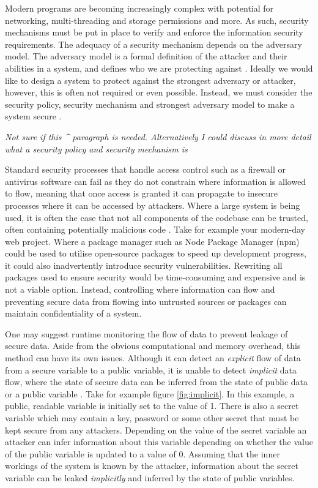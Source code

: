 \documentclass[twocolumn]{article}
\begin{document}
Modern programs are becoming increasingly complex with potential for networking, multi-threading and storage permissions and more. As such, security mechanisms must be put in place to verify and enforce the information security requirements. The adequacy of a security mechanism depends on the adversary model. The adversary model is a formal definition of the attacker and their abilities in a system, and defines who we are protecting against \cite{do2019role}. Ideally we would like to design a system to protect against the strongest adversary or attacker, however, this is often not required or even possible. Instead, we must consider the security policy, security mechanism and strongest adversary model to make a system secure \cite{balliu2014logics}.

\textit{Not sure if this \^{} paragraph is needed. Alternatively I could discuss in more detail what a security policy and security mechanism is}

Standard security processes that handle access control such as a firewall or antivirus software can fail as they do not constrain where information is allowed to flow, meaning that once access is granted it can propagate to insecure processes where it can be accessed by attackers. Where a large system is being used, it is often the case that not all components of the codebase can be trusted, often containing potentially malicious code \cite{sabelfeld2003language}. Take for example your modern-day web project. Where a package manager such as Node Package Manager (npm) could be used to utilise open-source packages to speed up development progress, it could also inadvertently introduce security vulnerabilities. Rewriting all packages used to ensure security would be time-consuming and expensive and is not a viable option. Instead, controlling where information can flow and preventing secure data from flowing into untrusted sources or packages can maintain confidentiality of a system.

One may suggest runtime monitoring the flow of data to prevent leakage of secure data. Aside from the obvious computational and memory overhead, this method can have its own issues. Although it can detect an \textit{explicit} flow of data from a secure variable to a public variable, it is unable to detect \textit{implicit} data flow, where the state of secure data can be inferred from the state of public data or a public variable \cite{denning1977certification}. Take for example figure \ref{fig:implicit}. In this example, a public, readable variable is initially set to the value of 1. There is also a secret variable which may contain a key, password or some other secret that must be kept secure from any attackers. Depending on the value of the secret variable an attacker can infer information about this variable depending on whether the value of the public variable is updated to a value of 0. Assuming that the inner workings of the system is known by the attacker, information about the secret variable can be leaked \textit{implicitly} and inferred by the state of public variables.
\end{document}
